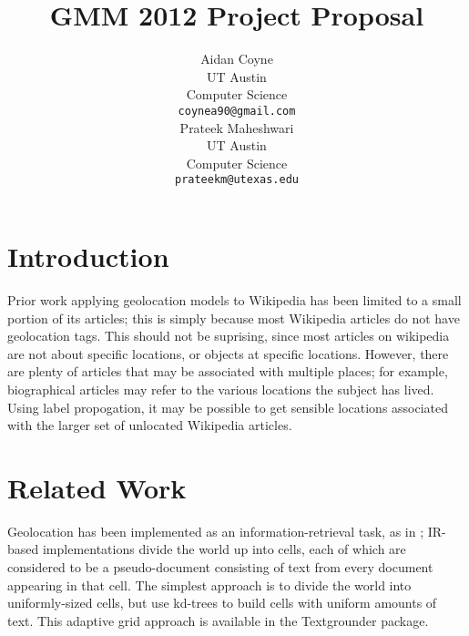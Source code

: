 \documentclass[11pt]{article}
\title{GMM 2012 Project Proposal}
\author{Aidan Coyne \\
    UT Austin\\
    Computer Science\\
  {\tt coynea90@gmail.com} \\ 
  \And
  Prateek Maheshwari\\
  UT Austin\\
  Computer Science\\
  {\tt prateekm@utexas.edu}}
\date{}
\begin{document}
\maketitle

\section{Introduction}
Prior work applying geolocation models to Wikipedia has been limited to a small portion of its articles;
this is simply because most Wikipedia articles do not have geolocation tags.
This should not be suprising, since most articles on wikipedia are not about specific locations, or objects at specific locations.
However, there are plenty of articles that may be associated with multiple places; for example, biographical articles may refer to the various locations the subject has lived.
Using label propogation, it may be possible to get sensible locations associated with the larger set of unlocated Wikipedia articles.

\section{Related Work}
Geolocation has been implemented as an information-retrieval task, as in
\cite{skiles:12}; IR-based implementations divide the world up into cells, each
of which are considered to be a pseudo-document consisting of text from every
document appearing in that cell.
The simplest approach is to divide the world into uniformly-sized cells, but
\cite{rolleretal:12} use kd-trees to build cells with uniform amounts of text.
This adaptive grid approach is available in the Textgrounder package.

\par
\cite{talukdar:09} \cite{talukdar:10}
\end{document}

